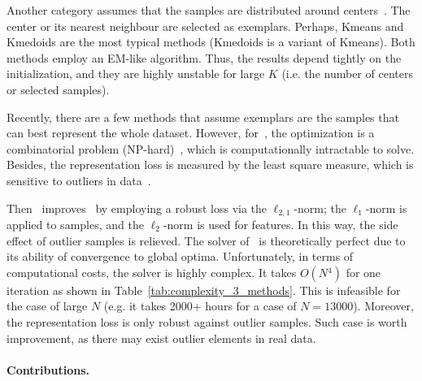 \documentclass[a4paper]{article}
\begin{document}
Another category assumes that the samples are distributed around centers\ \cite{Frey_2007_Science_ClusteringViaPassingMessages,zcLin_2010_ICML_RobstSubspaceSegmentation}.
The center or its nearest neighbour are selected as exemplars. Perhaps,
Kmeans and Kmedoids are the most typical methods (Kmedoids is a variant
of Kmeans). Both methods employ an EM-like algorithm. Thus, the results
depend tightly on the initialization, and they are highly unstable
for large $K$ (i.e. the number of centers or selected samples). 

Recently, there are a few methods that assume exemplars are the samples
that can best represent the whole dataset. However, for\ \cite{kaiYu_2006_ICML_activeLearning},
the optimization is a combinatorial problem (NP-hard)\ \cite{FpNie_2013_IJCAI_EarlyActiveLearning,kaiYu_2008_SIGIR_NonGreedy_TED},
which is computationally intractable to solve. Besides, the representation
loss is measured by the least square measure, which is sensitive to
outliers in data\ \cite{huaWang_2014_ICML_RobustMetricLearning,fyzhu_2014_JSTSP_RRLbS,FpNie_2013_IJCAI_EarlyActiveLearning}.

Then\ \cite{FpNie_2013_IJCAI_EarlyActiveLearning} improves\ \cite{kaiYu_2006_ICML_activeLearning}
by employing a robust loss via the $\ell_{2,1}$-norm; the $\ell_{1}$-norm
is applied to samples, and the $\ell_{2}$-norm is used for features.
In this way, the side effect of outlier samples is relieved. The solver
of\ \cite{FpNie_2013_IJCAI_EarlyActiveLearning} is theoretically
perfect due to its ability of convergence to global optima. Unfortunately,
in terms of computational costs, the solver is highly complex. It
takes $O\left(N{}^{4}\right)$ for one iteration as shown in Table\ \ref{tab:complexity_3_methods}.
This is infeasible for the case of large $N$ (e.g. it takes 2000+
hours for a case of $N=13000$). Moreover, the representation loss
is only robust against outlier samples. Such case is worth improvement,
as there may exist outlier elements in real data. 


\paragraph{Contributions. }
\end{document}
